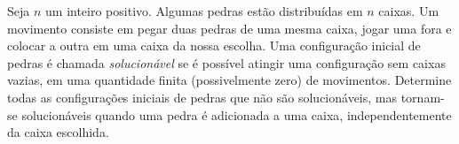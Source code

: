 Seja $n$ um inteiro positivo.
Algumas pedras estão distribuídas em $n$ caixas.
Um movimento consiste em pegar duas pedras de uma mesma caixa, jogar uma fora e colocar a outra em uma caixa da nossa escolha.
Uma configuração inicial de pedras é chamada \emph{solucionável} se é possível atingir uma configuração sem caixas vazias, em uma quantidade finita (possivelmente zero) de movimentos.
Determine todas as configurações iniciais de pedras que não são solucionáveis, mas tornam-se solucionáveis quando uma pedra é adicionada a uma caixa, independentemente da caixa escolhida.
